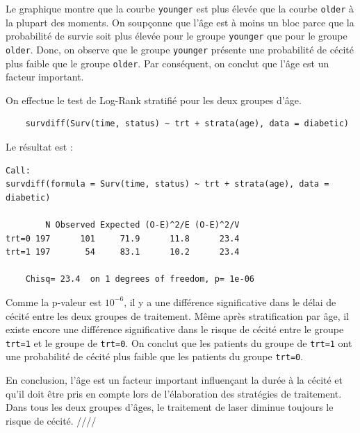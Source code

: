 \documentclass[../main.tex]{subfiles}
\begin{document}
\begin{CJK*}{UTF8}{gbsn}
Le graphique montre que la courbe \texttt{younger} est plus élevée que la courbe \texttt{older} 
à la plupart des moments.
On soupçonne que l'âge est à moins un bloc parce que 
la probabilité de survie soit plus 
élevée pour le groupe \texttt{younger} que pour le groupe \texttt{older}. 
Donc, on observe que le groupe \texttt{younger}
présente une probabilité de cécité plus faible que le groupe \texttt{older}.
Par conséquent, on conclut que l'âge est un facteur important.

On effectue le test de Log-Rank stratifié pour les deux groupes d'âge.

\begin{lstlisting}
    survdiff(Surv(time, status) ~ trt + strata(age), data = diabetic)
\end{lstlisting}

Le résultat est :

\begin{lstlisting}    
Call:
survdiff(formula = Surv(time, status) ~ trt + strata(age), data = diabetic)
        
        N Observed Expected (O-E)^2/E (O-E)^2/V
trt=0 197      101     71.9      11.8      23.4
trt=1 197       54     83.1      10.2      23.4
        
    Chisq= 23.4  on 1 degrees of freedom, p= 1e-06
\end{lstlisting}

Comme la p-valeur est $10^{-6}$,
il y a une différence significative dans le délai de cécité entre les deux groupes de traitement.
Même après stratification par âge, il existe encore une différence 
significative dans le risque de cécité entre le groupe \texttt{trt=1}
et le groupe de \texttt{trt=0}. 
On conclut que les patients du groupe de \texttt{trt=1} 
ont une probabilité de cécité plus faible que 
les patients du groupe \texttt{trt=0}. 

En conclusion, l'âge est un facteur important influençant la durée à la cécité 
et qu'il doit être pris en compte lors de l'élaboration des stratégies de traitement.
Dans tous les deux groupes d'âges, le traitement de laser diminue toujours 
le risque de cécité. ////

\end{CJK*}
\end{document}
